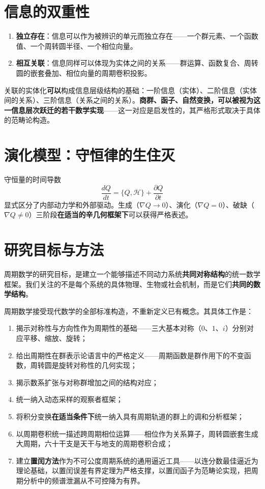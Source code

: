 \section*{信息的双重性}

\begin{enumerate}[leftmargin=4em, label={(\arabic*)}]
    \item \textbf{独立存在}：信息可以作为被辨识的单元而独立存在——一个群元素、一个函数值、一个周转圆半径、一个相位向量。
    \item \textbf{相互关联}：信息同样可以体现为实体之间的关系——群运算、函数复合、周转圆的嵌套叠加、相位向量的周期卷积投影。
\end{enumerate}

关联的实体化\textbf{可以}构成信息层级结构的基础：一阶信息（实体）、二阶信息（实体间的关系）、三阶信息（关系之间的关系）。\textbf{商群、函子、自然变换，可以被视为这一信息层次跃迁的若干数学实现}——这一对应是启发性的，其严格形式取决于具体的范畴论构造。

\section*{演化模型：守恒律的生住灭}

守恒量的时间导数
\[
\frac{dQ}{dt} = \{Q, \mathcal{H}\} + \frac{\partial Q}{\partial t}
\]
显式区分了内部动力学和外部驱动。生成（$\nabla Q \to 0$）、演化（$\nabla Q = 0$）、破缺（$\nabla Q \neq 0$）三阶段\textbf{在适当的辛几何框架下}可以获得严格表述。

\section*{研究目标与方法}

周期数学的研究目标，是建立一个能够描述不同动力系统\textbf{共同对称结构}的统一数学框架。我们关注的不是每个系统的具体物理、生物或社会机制，而是它们\textbf{共同的数学结构}。

周期数学接受现代数学的全部标准构造，不重新定义已有概念。其具体工作是：
\begin{enumerate}[leftmargin=4em, label={(\arabic*)}]
    \item 揭示对称性与方向性作为周期性的基础——三大基本对称（$0$、$1$、$i$）分别对应平移、缩放、旋转；
    \item 给出周期性在群表示论语言中的严格定义——周期函数是群作用下的不变函数，周转圆是旋转对称性的几何实现；
    \item 揭示数系扩张与对称群增加之间的结构对应；
    \item 统一纳入动态采样的观察者框架；
    \item 将积分变换\textbf{在适当条件下}统一纳入具有周期轨道的群上的调和分析框架；
    \item 以周期卷积统一描述跨周期相位运算——相位作为关系算子，周转圆嵌套生成大周期，六十干支是天干与地支的周期卷积合成；
    \item 建立\textbf{置闰方法}作为不可公度周期系统的通用逼近工具——以连分数最佳逼近为理论基础，以置闰误差有界定理为严格支撑，以置闰函子为范畴论实现，把周期分析中的频谱泄漏从不可控降为有界。
\end{enumerate}

